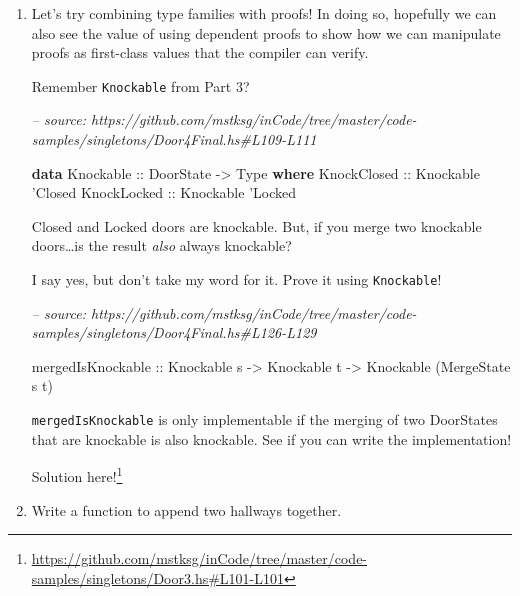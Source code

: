 \documentclass[]{article}
\newenvironment{Shaded}{}{}
\newcommand{\CommentTok}[1]{\textcolor[rgb]{0.38,0.63,0.69}{\textit{#1}}}
\newcommand{\DataTypeTok}[1]{\textcolor[rgb]{0.56,0.13,0.00}{#1}}
\newcommand{\KeywordTok}[1]{\textcolor[rgb]{0.00,0.44,0.13}{\textbf{#1}}}
\newcommand{\NormalTok}[1]{#1}
\newcommand{\OtherTok}[1]{\textcolor[rgb]{0.00,0.44,0.13}{#1}}
\renewcommand{\href}[2]{#2\footnote{\url{#1}}}
\begin{document}
\begin{enumerate}
\def\labelenumi{\arabic{enumi}.}
\item
  Let's try combining type families with proofs! In doing so, hopefully we can
  also see the value of using dependent proofs to show how we can manipulate
  proofs as first-class values that the compiler can verify.

  Remember \texttt{Knockable} from Part 3?

\begin{Shaded}
\begin{Highlighting}[]
\CommentTok{-- source: https://github.com/mstksg/inCode/tree/master/code-samples/singletons/Door4Final.hs#L109-L111}

\KeywordTok{data} \DataTypeTok{Knockable}\OtherTok{ ::} \DataTypeTok{DoorState} \OtherTok{->} \DataTypeTok{Type} \KeywordTok{where}
    \DataTypeTok{KnockClosed}\OtherTok{ ::} \DataTypeTok{Knockable}\NormalTok{ '}\DataTypeTok{Closed}
    \DataTypeTok{KnockLocked}\OtherTok{ ::} \DataTypeTok{Knockable}\NormalTok{ '}\DataTypeTok{Locked}
\end{Highlighting}
\end{Shaded}

  Closed and Locked doors are knockable. But, if you merge two knockable
  doors\ldots{}is the result \emph{also} always knockable?

  I say yes, but don't take my word for it. Prove it using \texttt{Knockable}!

\begin{Shaded}
\begin{Highlighting}[]
\CommentTok{-- source: https://github.com/mstksg/inCode/tree/master/code-samples/singletons/Door4Final.hs#L126-L129}

\NormalTok{mergedIsKnockable}
\OtherTok{    ::} \DataTypeTok{Knockable}\NormalTok{ s}
    \OtherTok{->} \DataTypeTok{Knockable}\NormalTok{ t}
    \OtherTok{->} \DataTypeTok{Knockable}\NormalTok{ (}\DataTypeTok{MergeState}\NormalTok{ s t)}
\end{Highlighting}
\end{Shaded}

  \texttt{mergedIsKnockable} is only implementable if the merging of two
  DoorStates that are knockable is also knockable. See if you can write the
  implementation!

  \href{https://github.com/mstksg/inCode/tree/master/code-samples/singletons/Door3.hs\#L101-L101}{Solution
  here!}
\item
  Write a function to append two hallways together.


\end{enumerate}
\end{document}
